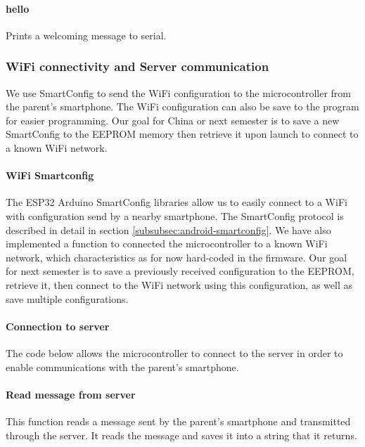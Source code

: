 \paragraph{hello} Prints a welcoming message to serial.



\subsubsection{WiFi connectivity and Server communication}\label{subsec:fw/Functions/WiFi}
We use SmartConfig to send the WiFi configuration to the microcontroller from the parent's smartphone. The WiFi configuration can also be save to the program for easier programming. 
Our goal for China or next semester is to save a new SmartConfig to the EEPROM memory then retrieve it upon launch to connect to a known WiFi network. 
    
\paragraph{WiFi Smartconfig}
The ESP32 Arduino SmartConfig libraries allow us to easily connect to a WiFi with configuration send by a nearby smartphone. The SmartConfig protocol is described in detail in section \ref{subsubsec:android-smartconfig}. 
\medskip
We have also implemented a function to connected the microcontroller to a known WiFi network, which characteristics as for now hard-coded in the firmware. Our goal for next semester is to save a previously received configuration to the EEPROM, retrieve it, then connect to the WiFi network using this configuration, as well as save multiple configurations. 


%

%


\paragraph{Connection to server}
The code below allows the microcontroller to connect to the server in order to enable communications with the parent's smartphone. 


\paragraph{Read message from server} This function reads a message sent by the parent's smartphone and transmitted through the server. It reads the message and saves it into a string that it returns. 


